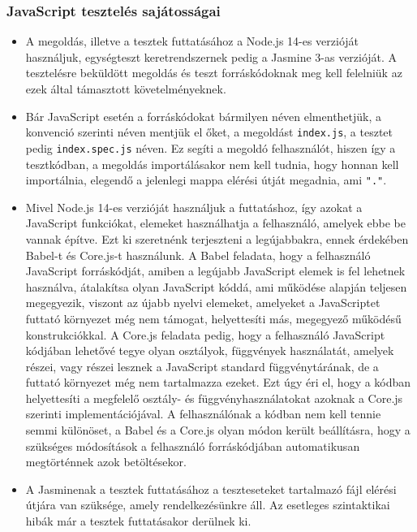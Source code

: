 \documentclass{elteikthesis}
\begin{document}
				\subsubsection{JavaScript tesztelés sajátosságai}
					\begin{itemize}
						\item A megoldás, illetve a tesztek futtatásához a Node.js 14-es verzióját használjuk, egységteszt keretrendszernek pedig a Jasmine 3-as verzióját. A tesztelésre beküldött megoldás és teszt forráskódoknak meg kell felelniük az ezek által támasztott követelményeknek.
						\item Bár JavaScript esetén a forráskódokat bármilyen néven elmenthetjük, a konvenció szerinti néven mentjük el őket, a megoldást \texttt{index.js}, a tesztet pedig \texttt{index.spec.js} néven. Ez segíti a megoldó felhasználót, hiszen így a tesztkódban, a megoldás importálásakor nem kell tudnia, hogy honnan kell importálnia, elegendő a jelenlegi mappa elérési útját megadnia, ami \texttt{"."}.
						\item Mivel Node.js 14-es verzióját használjuk a futtatáshoz, így azokat a JavaScript funkciókat, elemeket használhatja a felhasználó, amelyek ebbe be vannak építve. Ezt ki szeretnénk terjeszteni a legújabbakra, ennek érdekében Babel-t és Core.js-t használunk. A Babel feladata, hogy a felhasználó JavaScript forráskódját, amiben a legújabb JavaScript elemek is fel lehetnek használva, átalakítsa olyan JavaScript kóddá, ami működése alapján teljesen megegyezik, viszont az újabb nyelvi elemeket, amelyeket a JavaScriptet futtató környezet még nem támogat, helyettesíti más, megegyező működésű konstrukciókkal. A Core.js feladata pedig, hogy a felhasználó JavaScript kódjában lehetővé tegye olyan osztályok, függvények használatát, amelyek részei, vagy részei lesznek a JavaScript standard függvénytárának, de a futtató környezet még nem tartalmazza ezeket. Ezt úgy éri el, hogy a kódban helyettesíti a megfelelő osztály- és függvényhasználatokat azoknak a Core.js szerinti implementációjával. A felhasználónak a kódban nem kell tennie semmi különöset, a Babel és a Core.js olyan módon került beállításra, hogy a szükséges módosítások a felhasználó forráskódjában automatikusan megtörténnek azok betöltésekor.
						\item A Jasminenak a tesztek futtatásához a teszteseteket tartalmazó fájl elérési útjára van szüksége, amely rendelkezésünkre áll. Az esetleges szintaktikai hibák már a tesztek futtatásakor derülnek ki.
					\end{itemize}
\end{document}
